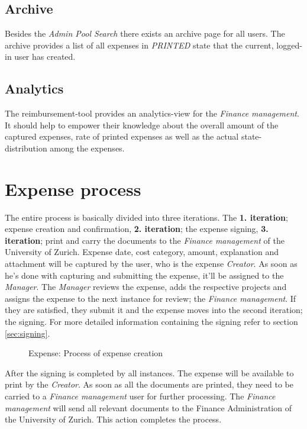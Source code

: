 \subsection{Archive}
Besides the \textit{Admin Pool Search} there exists an archive page for all users. The archive provides a list of all expenses in \textit{PRINTED} state that the current, logged-in user has created.

\subsection{Analytics}
The reimbursement-tool provides an analytics-view for the \textit{Finance management}. It should help to empower their knowledge about the overall amount of the captured expenses, rate of printed expenses as well as the actual state-distribution among the expenses.  


\section{Expense process}
\label{sec:process}

The entire process is basically divided into three iterations. The \textbf{1. iteration}; expense creation and confirmation, \textbf{2. iteration}; the expense signing, \textbf{3. iteration}; print and carry the documents to the \textit{Finance management} of the University of Zurich.\newline 
Expense date, cost category, amount, explanation and attachment will be captured by the user, who is the expense \textit{Creator}. As soon as he's done with capturing and submitting the expense, it'll be assigned to the \textit{Manager}. The \textit{Manager} reviews the expense, adds the respective projects and assigns the expense to the next instance for review; the \textit{Finance management}. If they are satisfied, they submit it and the expense moves into the second iteration; the signing. For more detailed information containing the signing refer to section \ref{sec:signing}.\newline

\begin{figure}[H]
    \centering
    \caption{Expense: Process of expense creation}
    \label{fig:expense-process}
\end{figure}

After the signing is completed by all instances. The expense will be available to print by the \textit{Creator}. As soon as all the documents are printed, they need to be carried to a \textit{Finance management} user for further processing. The \textit{Finance management} will send all relevant documents to the Finance Administration of the University of Zurich. This action completes the process.   

